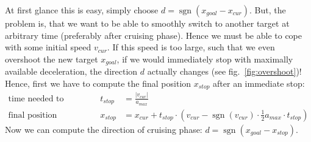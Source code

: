 \documentclass[11pt,english]{article}
\newcommand{\xc}{x_{cur}}
\newcommand{\xg}{x_{goal}}
\newcommand{\xs}{x_{stop}}
\newcommand{\ts}{t_{stop}}
\newcommand{\vc}{v_{cur}}
\newcommand{\am}{a_{max}}
\newcommand{\half}{\frac{1}{2}}
\newcommand{\abs}[1]{|#1|}
\newcommand{\sgn}{\operatorname{sgn}}
\begin{document}
At first glance this is easy, simply choose $d=\sgn(\xg - \xc)$. But, the
problem is, that we want to be able to smoothly switch to another target at
arbitrary time (preferably after cruising phase). Hence we must be able to
cope with some initial speed $\vc$. If this speed is too large, such that we
even overshoot the new target $\xg$, if we would immediately stop with
maximally available deceleration, the direction $d$ actually changes (see fig.~\ref{fig:overshoot})!
Hence, first we have to compute the final position $\xs$ after an immediate
stop: 
\begin{align*}
  \text{time needed to stop:}& \qquad&
  \ts &= \frac{\abs{\vc}}{\am} \\
  \text{final position after stop:}& \qquad&
  \xs &= \xc + \ts \cdot (\vc - \sgn(\vc) \cdot \half \am \cdot \ts)
\end{align*}
Now we can compute the direction of cruising phase: $d = \sgn (\xg - \xs)$.
\end{document}

